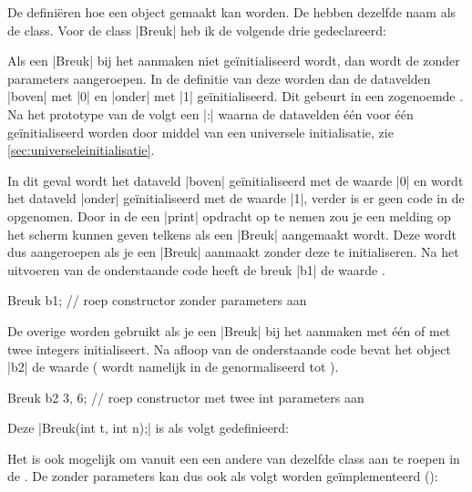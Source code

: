 \begin{cpplstShortInline}
\label{sec:constructor}
De \label{constructor} definiëren hoe een object gemaakt kan worden.
De  hebben dezelfde naam als de class.
Voor de class |Breuk| heb ik de volgende drie  gedeclareerd:

Als een |Breuk| bij het aanmaken niet geïnitialiseerd wordt, dan wordt de  zonder parameters aangeroepen.
In de definitie van deze  worden dan de datavelden |boven| met |0| en |onder| met |1| geïnitialiseerd. 
Dit gebeurt in een zogenoemde \label{initialization list}\emph{}. 
Na het prototype van de  volgt een |:| waarna de datavelden één voor één geïnitialiseerd worden door middel van een universele initialisatie, zie \cref{sec:universeleinitialisatie}.

In dit geval wordt het dataveld |boven| geïnitialiseerd met de waarde |0| en wordt het dataveld |onder| geïnitialiseerd met de waarde |1|, verder is er geen code in de  opgenomen.
Door in de  een |print| opdracht op te nemen zou je een melding op het scherm kunnen geven telkens als een |Breuk| aangemaakt wordt.
Deze  wordt dus aangeroepen als je een |Breuk| aanmaakt zonder deze te initialiseren.
Na het uitvoeren van de onderstaande code heeft de breuk |b1| de waarde .
\begin{cpplstfragment}
    Breuk b1; // roep constructor zonder parameters aan
\end{cpplstfragment}

De overige  worden gebruikt als je een |Breuk| bij het aanmaken met één of met twee integers initialiseert.
Na afloop van de onderstaande code bevat het object |b2| de waarde  ( wordt namelijk in de  genormaliseerd tot ). 
\begin{cpplstfragment}
    Breuk b2 {3, 6}; // roep constructor met twee int parameters aan
\end{cpplstfragment}

Deze  |Breuk(int t, int n);| is als volgt gedefinieerd:

Het is ook mogelijk om vanuit een  een andere  van dezelfde class aan te roepen in de . 
De  zonder parameters kan dus ook als volgt worden geïmplementeerd
():


\end{cpplstShortInline}
